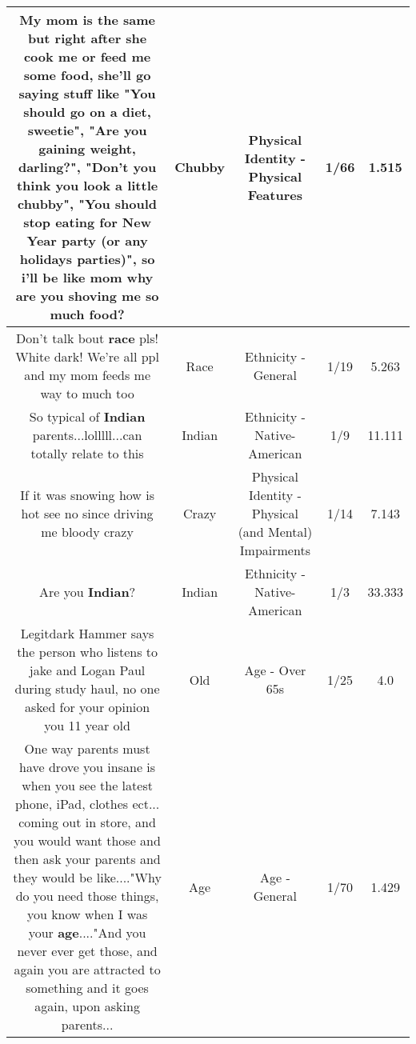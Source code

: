 \documentclass[11pt]{article}
\newlength\mylength
\begin{document}
\begin{center}
\begin{longtable}{|C{.65\mylength}|C{.30\mylength}|C{.12\mylength}|C{.12\mylength}|C{.12\mylength}|}
  \small My mom is the same but right after she cook me or feed me some food, she'll go saying stuff like "You should go on a diet, sweetie", "Are you gaining weight, darling?", "Don't you think you look a little \textbf{chubby}", "You should stop eating for New Year party (or any holidays parties)", so i'll be like mom why are you shoving me so much food?\normalsize   & Chubby & Physical Identity - Physical Features & 1/66 & 1.515 \\  \hline
  \small Don't talk bout \textbf{race} pls! White dark! We're all ppl and my mom feeds me way to much too\normalsize   & Race & Ethnicity - General & 1/19 & 5.263 \\  \hline
  \small So typical of \textbf{Indian} parents...lolllll...can totally relate to this\normalsize   & Indian & Ethnicity - Native-American & 1/9 & 11.111 \\  \hline
  \small If it was snowing how is hot see no since driving me bloody crazy\normalsize   & Crazy & Physical Identity - Physical (and Mental) Impairments & 1/14 & 7.143 \\  \hline
  \small Are you \textbf{Indian}?\normalsize   & Indian & Ethnicity - Native-American & 1/3 & 33.333 \\  \hline
  \small Legitdark Hammer says the person who listens to jake and Logan Paul during study haul, no one asked for your opinion you 11 year old\normalsize   & Old & Age - Over 65s & 1/25 & 4.0 \\  \hline
  \small One way parents must have drove you insane is when you see the latest phone, iPad, clothes ect... coming out in store, and you would want those and then ask your parents and they would be like...."Why do you need those things, you know when I was your \textbf{age}...."And you never ever get those, and again you are attracted to something and it goes again, upon asking parents...\normalsize   & Age & Age - General & 1/70 & 1.429 \\  \hline

\end{longtable}
\end{center}
\end{document}
